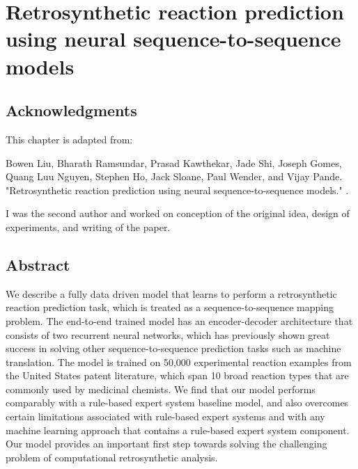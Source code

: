 \section{Retrosynthetic reaction prediction using neural sequence-to-sequence models}

\subsection{Acknowledgments}

This chapter is adapted from: 

Bowen Liu, Bharath Ramsundar, Prasad Kawthekar, Jade Shi, Joseph Gomes, Quang Luu Nguyen, Stephen Ho, Jack Sloane, Paul Wender, and Vijay Pande. "Retrosynthetic reaction prediction using neural sequence-to-sequence models." \cite{liu2017retrosynthetic}. 

I was the second author and worked on conception of the original idea, design of experiments, and writing of the paper.


\subsection{Abstract}
We describe a fully data driven model that learns to perform a retrosynthetic reaction prediction task, which is treated as a sequence-to-sequence mapping problem. The end-to-end trained model has an encoder-decoder architecture that consists of two recurrent neural networks, which has previously shown great success in solving other sequence-to-sequence prediction tasks such as machine translation. The model is trained on 50,000 experimental reaction examples from the United States patent literature, which span 10 broad reaction types that are commonly used by medicinal chemists. We find that our model performs comparably with a rule-based expert system baseline model, and also overcomes certain limitations associated with rule-based expert systems and with any machine learning approach that contains a rule-based expert system component. Our model provides an important first step towards solving the challenging problem of computational retrosynthetic analysis. 

